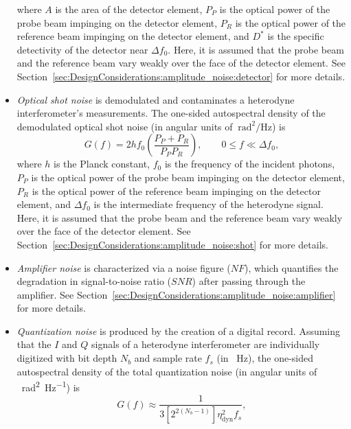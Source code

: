 \begin{itemize}
\begin{equation}
    \end{equation}
    where $A$ is the area of the detector element,
    $P_P$ is the optical power of the probe beam
    impinging on the detector element,
    $P_R$ is the optical power of the reference beam
    impinging on the detector element,
    and $D^*$ is the specific detectivity of the detector near $\Delta f_0$.
    Here, it is assumed that the probe beam and the reference beam
    vary weakly over the face of the detector element.
    See Section~\ref{sec:DesignConsiderations:amplitude_noise:detector}
    for more details.
  \item \emph{Optical shot noise} is demodulated and
    contaminates a heterodyne interferometer's measurements.
    The one-sided autospectral density
    of the demodulated optical shot noise
    (in angular units of $\SI{}{\radian\squared\per\Hz}$) is
    \begin{equation}
      G(f)
      =
      2 h f_0 \left( \frac{P_P + P_R}{P_P P_R} \right),
      \qquad
      0 \leq f \ll \Delta f_0,
      \label{eq:DesignConsiderations:summary:shot_noise_autospectral_density}
    \end{equation}
    where $h$ is the Planck constant,
    $f_0$ is the frequency of the incident photons,
    $P_P$ is the optical power of the probe beam
    impinging on the detector element,
    $P_R$ is the optical power of the reference beam
    impinging on the detector element, and
    $\Delta f_0$ is the intermediate frequency of the heterodyne signal.
    Here, it is assumed that the probe beam and the reference beam
    vary weakly over the face of the detector element.
    See Section~\ref{sec:DesignConsiderations:amplitude_noise:shot}
    for more details.
  \item \emph{Amplifier noise} is characterized via a noise figure ($NF$),
    which quantifies the degradation in signal-to-noise ratio ($SNR$)
    after passing through the amplifier.
    See Section~\ref{sec:DesignConsiderations:amplitude_noise:amplifier}
    for more details.
  \item \emph{Quantization noise} is produced
    by the creation of a digital record.
    Assuming that the $I$ and $Q$ signals of a heterodyne interferometer
    are individually digitized with bit depth $N_b$ and
    sample rate $f_s$ (in \SI{}{\hertz}),
    the one-sided autospectral density of the total quantization noise
    (in angular units of \SI{}{\radian\squared\per\hertz}) is
    \begin{equation}
      G(f)
      \approx
      \frac{1}{3 \left[ 2^{2 (N_b - 1)} \right] \eta_{\text{dyn}}^2 f_s},

\end{equation}
\end{itemize}
